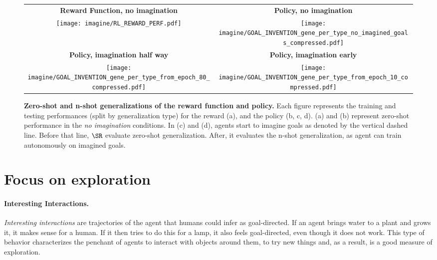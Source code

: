 \begin{figure*}[!h]
    \centering
    \begin{tabular}{cc}
    \textbf{Reward Function, no imagination} & \textbf{Policy, no imagination} \\
	\texttt{[image: imagine/RL\_REWARD\_PERF.pdf]} & \texttt{[image: imagine/GOAL\_INVENTION\_gene\_per\_type\_no\_imagined\_goals\_compressed.pdf]}\\
    \textbf{Policy, imagination half way} & \textbf{Policy, imagination early} \\
    \texttt{[image: imagine/GOAL\_INVENTION\_gene\_per\_type\_from\_epoch\_80\_compressed.pdf]} &\texttt{[image: imagine/GOAL\_INVENTION\_gene\_per\_type\_from\_epoch\_10\_compressed.pdf]}
    
    \end{tabular}
    
    \caption{\textbf{Zero-shot and n-shot generalizations of the reward function and policy.} Each figure represents the training and testing performances (split by generalization type) for the reward (a), and the policy (b, c, d). (a) and (b) represent zero-shot performance in the \textit{no imagination} conditions. In (c) and (d), agents start to imagine goals as denoted by the vertical dashed line. Before that line, $\SR$ evaluate zero-shot generalization. After, it evaluates the n-shot generalization, as agent can train autonomously on imagined goals.\label{fig:suppl_gen}}
\end{figure*} 


\clearpage

\section{Focus on exploration}
\label{sec:suppl_exploration}
\paragraph{Interesting Interactions.} \textit{Interesting interactions} are trajectories of the agent that humans could infer as goal-directed. If an agent brings water to a plant and grows it, it makes sense for a human. If it then tries to do this for a lamp, it also feels goal-directed, even though it does not work. This type of behavior characterizes the penchant of agents to interact with objects around them, to try new things and, as a result, is a good measure of exploration. 


